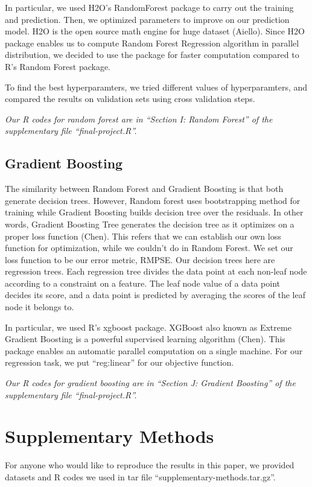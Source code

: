 \documentclass[letterpaper,twocolumn,11pt]{article}
\begin{document}
In particular, we used H2O’s RandomForest package to carry out the training and prediction. Then, we optimized parameters to improve on our prediction model. H2O is the open source math engine for huge dataset (Aiello). Since H2O package enables us to compute Random Forest Regression algorithm in parallel distribution, we decided to use the package for faster computation compared to R's Random Forest package.

To find the best hyperparamters, we tried different values of hyperparamters, and compared the results on validation sets using cross validation steps.

\textit{Our R codes for random forest are in ``Section I: Random Forest'' of the supplementary file ``final-project.R''.}

\subsection{Gradient Boosting}
The similarity between Random Forest and Gradient Boosting is that both generate decision trees. However, Random forest uses bootstrapping method for training while Gradient Boosting builds decision tree over the residuals. In other words, Gradient Boosting Tree generates the decision tree as it optimizes on a proper loss function (Chen). This refers that we can establish our own loss function for optimization, while we couldn't do in Random Forest. We set our loss function to be our error metric, RMPSE. Our decision trees here are regression trees. Each regression tree divides the data point at each non-leaf node according to a constraint on a feature. The leaf node value of a data point decides its score, and a data point is predicted by averaging the scores of the leaf node it belongs to.

In particular, we used R's xgboost package. XGBoost also known as Extreme Gradient Boosting is a powerful supervised learning algorithm (Chen). This package enables an automatic parallel computation on a single machine. For our regression task, we put ``reg:linear'' for our objective function. 


\textit{Our R codes for gradient boosting are in ``Section J: Gradient Boosting'' of the supplementary file ``final-project.R''.}

\section{Supplementary Methods}
For anyone who would like to reproduce the results in this paper, we provided datasets and R codes we used in tar file ``supplementary-methods.tar.gz''.
\end{document}
